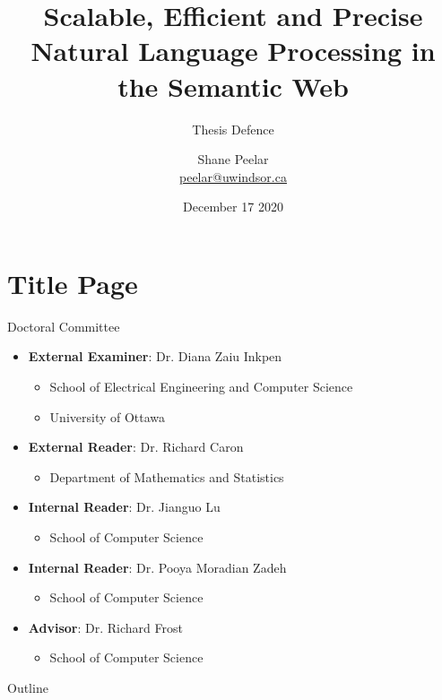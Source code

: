 \documentclass[logoontitle,tabu,supertabular,aspectratio=43]{preney-uwindsor-beamer}
\title{Scalable, Efficient and Precise Natural Language Processing in the Semantic Web}
\subtitle{Thesis Defence}
\date[December 17 2020]{December 17 2020}
\author[]{\small Shane Peelar \texorpdfstring{\\}{} {\scriptsize\href{mailto:\emailshane}{peelar@uwindsor.ca}}}
\institute[University of Windsor]{
    School of Computer Science \texorpdfstring{\\}{}
    University of Windsor \texorpdfstring{\\}{}
    Windsor, Ontario, Canada \texorpdfstring{\\}{}
}
\begin{document}
	\tabulinesep=1pt

	\section*{Title Page}
	\begin{frame}
	\titlepage
	\end{frame}

  \begin{frame}{Doctoral Committee}
    \begin{itemize}
        \item[] \textbf{External Examiner}: Dr. Diana Zaiu Inkpen %
        \begin{itemize}
            \item[] School of Electrical Engineering and Computer Science
            \item[] University of Ottawa
        \end{itemize}
        \item[] \textbf{External Reader}: Dr. Richard Caron
        \begin{itemize}
            \item[] Department of Mathematics and Statistics
        \end{itemize}
        \item[] \textbf{Internal Reader}: Dr. Jianguo Lu
        \begin{itemize}
            \item[] School of Computer Science
        \end{itemize}
        \item[] \textbf{Internal Reader}: Dr. Pooya Moradian Zadeh
        \begin{itemize}
            \item[] School of Computer Science
        \end{itemize}
        \item[] \textbf{Advisor}: Dr. Richard Frost
        \begin{itemize}
            \item[] School of Computer Science
        \end{itemize}
    \end{itemize}
    \end{frame}

    \begin{frame}[allowframebreaks]{Outline}
       \tableofcontents[subsectionstyle=hide/hide/hide]
    \end{frame}
\end{document}
